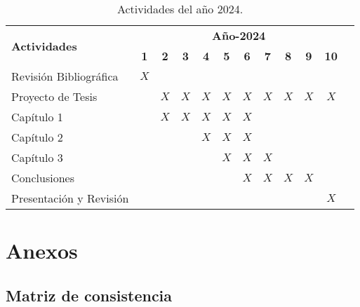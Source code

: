 \begin{center}
\begin{table}[htb]
\begin{tabular}{|p{6cm}|c|c|c|c|c|c|c|c|c|c|c|}
\hline
\multirow{2}{*}{\textbf{Actividades }} &\multicolumn{10}{c|}{\textbf{Año-2024}} \\

 \cline{2-11}
 & \textbf{1} & \textbf{2} & \textbf{3}&\textbf{4}&\textbf{5}&\textbf{6}&
 \textbf{7}&\textbf{8}&\textbf{9}&\textbf{10}\\ \hline
 Revisión Bibliográfica & $X$ &&&&&&&&&\\ \hline
 Proyecto de Tesis &&$X$ &$X$&$X$&$X$&$X$&$X$&$X$&$X$&$X$ \\ \hline
 Capítulo 1 &&$X$ & $X$&$X$&$X$&$X$&&&&\\ \hline
Capítulo 2&&& &$X$&$X$& $X$& &&&\\ \hline
Capítulo 3 &&& &&$X$&$X$&$X$& & &\\ \hline
Conclusiones&&& &&&$X$&$X$&$X$&$X$& \\ \hline
Presentación y Revisión&&& &&&&&&&$X$\\ \hline
\end{tabular}
\caption{Actividades del año 2024.}
\label{tabla:final}
\end{table}
\end{center}


\section{Anexos}

\subsection{Matriz de consistencia}